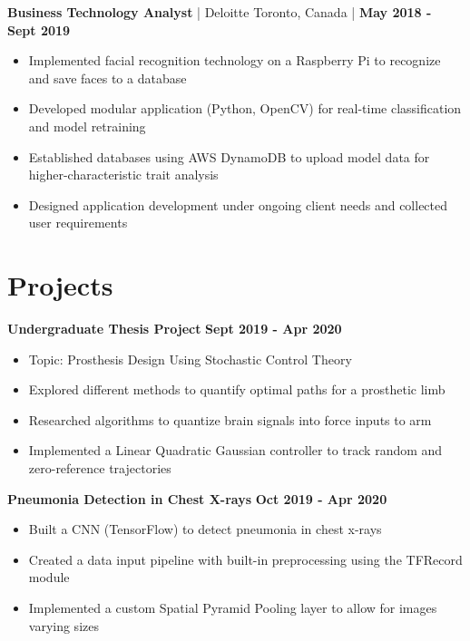 \documentclass[11pt]{article}
\newcommand{\jobentry}[4]%
{
\vspace{-0.1em} \noindent
{\large {\bfseries #1} | #2}
\hfill
#3 {\large | {\bfseries #4}}
\vspace{-0.25em}
}%
\newcommand{\projentry}[2]%
{
\vspace{-0.1em} \noindent
{\large
    {\bfseries #1}
    \hfill
    {\bfseries #2}
}
\vspace{-0.25em}
}%
\begin{document}
\jobentry{Business Technology Analyst}{Deloitte}{Toronto, Canada}{May 2018 - Sept 2019}
\begin{itemize}%
    \item Implemented facial recognition technology on a Raspberry Pi to recognize and save faces to a database 
    \item Developed modular application (Python, OpenCV) for real-time classification and model retraining
    \item Established databases using AWS DynamoDB to upload model data for higher-characteristic trait analysis
    \item Designed application development under ongoing client needs and collected user requirements
\end{itemize}%


\section{Projects}%
\projentry{Undergraduate Thesis Project}{Sept 2019 - Apr 2020}
\begin{itemize}%
    \item Topic: Prosthesis Design Using Stochastic Control Theory
    \item Explored different methods to quantify optimal paths for a prosthetic limb
    \item Researched algorithms to quantize brain signals into force inputs to arm
    \item Implemented a Linear Quadratic Gaussian controller to track random and zero-reference trajectories
\end{itemize}%

\projentry{Pneumonia Detection in Chest X-rays}{Oct 2019 - Apr 2020}
\begin{itemize}%
    \item Built a CNN (TensorFlow) to detect pneumonia in chest x-rays
    \item Created a data input pipeline with built-in preprocessing using the TFRecord module
    \item Implemented a custom Spatial Pyramid Pooling layer to allow for images varying sizes
\end{itemize}%
\end{document}
